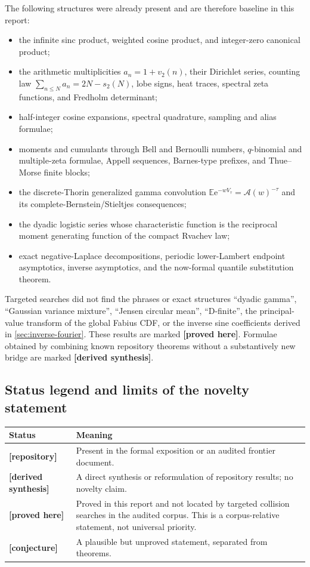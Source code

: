 \documentclass[11pt,oneside]{article}
\theoremstyle{definition}
\theoremstyle{remark}
\newcommand{\E}{\mathbb E}
\newcommand{\e}{\mathrm e}
\newcommand{\vtwo}{v_2}
\newcommand{\wt}{s_2}
\newcommand{\Acal}{\mathcal A}
\newcommand{\Repo}{\textcolor{deepblue}{\textbf{[repository]}}}
\newcommand{\Derived}{\textcolor{deepgreen}{\textbf{[derived synthesis]}}}
\newcommand{\New}{\textcolor{amber}{\textbf{[proved here]}}}
\newcommand{\Conj}{\textcolor{deepred}{\textbf{[conjecture]}}}
\begin{document}
The following structures were already present and are therefore baseline in this report:
\begin{itemize}[leftmargin=2em]
\item the infinite sinc product, weighted cosine product, and integer-zero canonical product;
\item the arithmetic multiplicities $a_n=1+\vtwo(n)$, their Dirichlet series, counting law
      $\sum_{n\le N}a_n=2N-\wt(N)$, lobe signs, heat traces, spectral zeta functions, and
      Fredholm determinant;
\item half-integer cosine expansions, spectral quadrature, sampling and alias formulae;
\item moments and cumulants through Bell and Bernoulli numbers, $q$-binomial and multiple-zeta
      formulae, Appell sequences, Barnes-type prefixes, and Thue--Morse finite blocks;
\item the discrete-Thorin generalized gamma convolution
      $\E\e^{-wV_\tau}=\Acal(w)^{-\tau}$ and its complete-Bernstein/Stieltjes consequences;
\item the dyadic logistic series whose characteristic function is the reciprocal moment
      generating function of the compact Rvachev law;
\item exact negative-Laplace decompositions, periodic lower-Lambert endpoint asymptotics,
      inverse asymptotics, and the now-formal quantile substitution theorem.
\end{itemize}
Targeted searches did not find the phrases or exact structures ``dyadic gamma'', ``Gaussian
variance mixture'', ``Jensen circular mean'', ``D-finite'', the principal-value transform
of the global Fabius CDF, or the inverse sine coefficients derived in
\cref{sec:inverse-fourier}.  These results are marked \New.  Formulae obtained by combining
known repository theorems without a substantively new bridge are marked \Derived.

\subsection{Status legend and limits of the novelty statement}

\begin{longtable}{@{}p{}p{}@{}}
\toprule
Status & Meaning \\
\midrule
\endhead
\Repo & Present in the formal exposition or an audited frontier document. \\
\Derived & A direct synthesis or reformulation of repository results; no novelty claim. \\
\New & Proved in this report and not located by targeted collision searches in the audited
       corpus.  This is a corpus-relative statement, not universal priority. \\
\Conj & A plausible but unproved statement, separated from theorems. \\
\bottomrule
\end{longtable}
\end{document}

